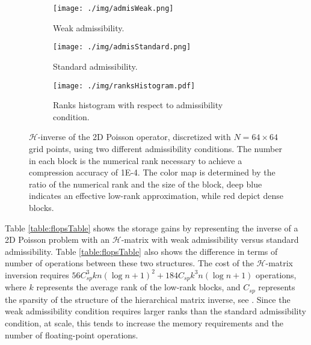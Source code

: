 \documentclass[]{elsarticle}
\begin{document}
\begin{figure}[H]
	\begin{subfigure}{.5\textwidth}
		\centering
		\texttt{[image: ./img/admisWeak.png]}
		\caption{Weak admissibility.}
	\end{subfigure}
	\begin{subfigure}{.5\textwidth}
		\centering
		\texttt{[image: ./img/admisStandard.png]}
		\caption{Standard admissibility.}
	\end{subfigure}
	\begin{subfigure}{1.0\textwidth}
		\centering
		\texttt{[image: ./img/ranksHistogram.pdf]}
		\caption{Ranks histogram with respect to admissibility condition.}
	\end{subfigure}
\caption{$\mathcal{H}$-inverse of the 2D Poisson operator, discretized with $N=64\times64$ grid points, using two different admissibility conditions. The number in each block is the numerical rank necessary to achieve a compression accuracy of 1E-4. The color map is determined by the ratio of the numerical rank and the size of the block, deep blue indicates an effective low-rank approximation, while red depict dense blocks.}
\label{fig:admisibilities}
\end{figure}

\nocite{trefethen1997numerical}

Table \ref{table:flopsTable} shows the storage gains by representing the inverse of a 2D Poisson problem with an $\mathcal{H}$-matrix with weak  admissibility versus standard admissibility. Table \ref{table:flopsTable} also shows the difference in terms of number of operations between these two structures. The cost of the $\mathcal{H}$-matrix inversion requires $56 C_{sp}^3 k n(\log n +1)^2 + 184 C_{sp} k^3 n (\log n +1)$ operations, where $k$ represents the average rank of the low-rank blocks, and $C_{sp}$ represents the sparsity of the structure of the hierarchical matrix inverse, see \cite{hackbusch2015hierarchical}. Since the weak admissibility condition requires larger ranks than the standard admissibility condition, at scale, this tends to increase the memory requirements and the number of floating-point operations.
\end{document}
